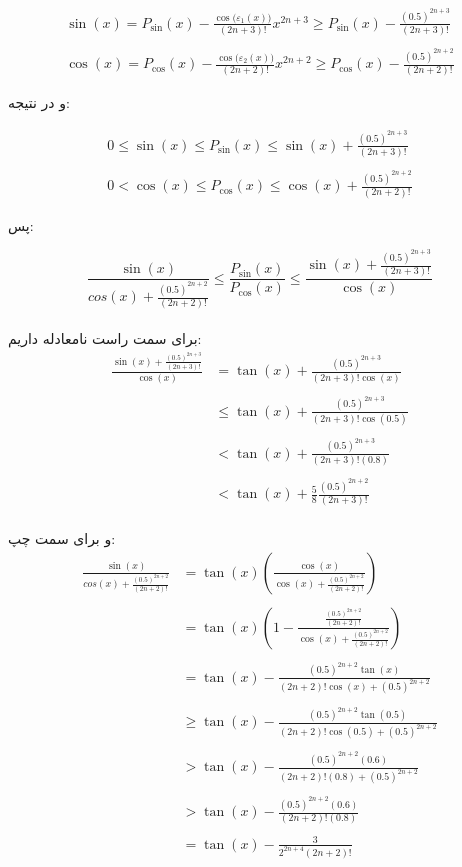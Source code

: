 \documentclass[12pt,a4paper]{article}
\begin{document}
\begin{gather*}
\sin(x)=P_{\sin}(x)-
\frac{\cos\bigl(\varepsilon_1(x)\bigr)}
{(2n+3)!}x^{2n+3} \ge P_{\sin}(x)-
\frac{(0.5)^{2n+3}}
{(2n+3)!} \\\\
\cos(x)=P_{\cos}(x)-
\frac{\cos\bigl(\varepsilon_2(x)\bigr)}
{(2n+2)!}x^{2n+2} \ge P_{\cos}(x)-
\frac{(0.5)^{2n+2}}
{(2n+2)!}
\end{gather*}

\vspace{0.4cm}
و در نتیجه:

\begin{gather*}
0 \le \sin(x) \le P_{\sin}(x) \le \sin(x) + \frac{(0.5)^{2n+3}}
{(2n+3)!} \\\\
0 < \cos(x) \le P_{\cos}(x) \le \cos(x) + \frac{(0.5)^{2n+2}}
{(2n+2)!}
\end{gather*}

\vspace{0.4cm}
پس:

 \begin{equation*}
 \frac{\sin(x)}{cos(x) + \frac{(0.5)^{2n+2}}{(2n+2)!}} \le 
 \frac{P_{\sin}(x)}{P_{\cos}(x)} \le
 \frac{\sin(x) + \frac{(0.5)^{2n+3}}{(2n+3)!}}{\cos(x)}
 \end{equation*}
\\
 برای سمت راست نامعادله داریم:
 \begin{align*}
     \frac{\sin(x) + \frac{(0.5)^{2n+3}}{(2n+3)!}}{\cos(x)} &=
     \tan(x) + \frac{(0.5)^{2n+3}}{(2n+3)!\cos(x)} \\\\ &\le
     \tan(x) + \frac{(0.5)^{2n+3}}{(2n+3)!\cos(0.5)} \\\\ &<
     \tan(x) + \frac{(0.5)^{2n+3}}{(2n+3)!(0.8)} \\\\ &<
     \tan(x) + \frac{5}{8}\frac{(0.5)^{2n+2}}{(2n+3)!}
 \end{align*}
 \\
 و برای سمت چپ: 
 \begin{align*}
     \frac{\sin(x)}{cos(x) + \frac{(0.5)^{2n+2}}{(2n+2)!}} &=
     \tan(x)\left( \frac{\cos(x)}{\cos(x) + \frac{(0.5)^{2n+2}}{(2n+2)!}} \right) \\\\ &=
     \tan(x)\left( 1 - \frac{\frac{(0.5)^{2n+2}}{(2n+2)!}}{\cos(x) + \frac{(0.5)^{2n+2}} {(2n+2)!}} \right) \\\\ &=
     \tan(x) - \frac{(0.5)^{2n+2}\tan(x)}{(2n+2)!\cos(x) + (0.5)^{2n+2}} \\\\ &\ge
     \tan(x) - \frac{(0.5)^{2n+2}\tan(0.5)}{(2n+2)!\cos(0.5) + (0.5)^{2n+2}} \\\\ &>
     \tan(x) - \frac{(0.5)^{2n+2}(0.6)}{(2n+2)!(0.8) + (0.5)^{2n+2}} \\\\ &>
     \tan(x) - \frac{(0.5)^{2n+2}(0.6)}{(2n+2)!(0.8)} \\\\ &=
     \tan(x) - \frac{3}{2^{2n+4}(2n+2)!}
 \end{align*}
\end{document}
